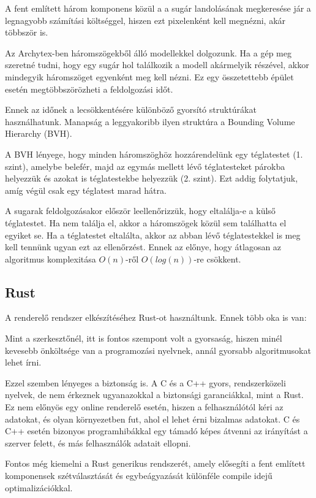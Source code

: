 A fent említett három komponens közül a a sugár landolásának megkeresése jár a legnagyobb számítási költséggel, hiszen ezt pixelenként kell megnézni, akár többször is.

Az Archytex-ben háromszögekből álló modellekkel dolgozunk. Ha a gép meg szeretné tudni, hogy egy sugár hol találkozik a modell akármelyik részével, akkor mindegyik háromszöget egyenként meg kell nézni. Ez egy összetettebb épület esetén megtöbbszörözheti a feldolgozási időt.

Ennek az időnek a lecsökkentésére különböző gyorsító struktúrákat használhatunk. Manapság a leggyakoribb ilyen struktúra a Bounding Volume Hierarchy (BVH).

A BVH lényege, hogy minden háromszöghöz hozzárendelünk egy téglatestet (1. szint), amelybe belefér, majd az egymás mellett lévő téglatesteket párokba helyezzük és azokat is téglatestekbe helyezzük (2. szint). Ezt addig folytatjuk, amíg végül csak egy téglatest marad hátra.

A sugarak feldolgozásakor először leellenőrizzük, hogy eltalálja-e a külső téglatestet. Ha nem találja el, akkor a háromszögek közül sem találhatta el egyiket se. Ha a téglatestet eltalálta, akkor az abban lévő téglatestekkel is meg kell tennünk ugyan ezt az ellenőrzést. Ennek az előnye, hogy átlagosan az algoritmus komplexitása $O(n)$-ről $O(log(n))$-re csökkent.

\subsection{Rust}
A renderelő rendszer elkészítéséhez Rust-ot használtunk. Ennek több oka is van:

Mint a szerkesztőnél, itt is fontos szempont volt a gyorsaság, hiszen minél kevesebb önköltsége van a programozási nyelvnek, annál gyorsabb algoritmusokat lehet írni.

Ezzel szemben lényeges a biztonság is. A C és a C++ gyors, rendszerközeli nyelvek, de nem érkeznek ugyanazokkal a biztonsági garanciákkal, mint a Rust. Ez nem előnyös egy online renderelő esetén, hiszen a felhasználótól kéri az adatokat, és olyan környezetben fut, ahol el lehet érni bizalmas adatokat. C és C++ esetén bizonyos programhibákkal egy támadó képes átvenni az irányítást a szerver felett, és más felhasználók adatait ellopni.

Fontos még kiemelni a Rust generikus rendszerét, amely elősegíti a fent említett komponensek szétválasztását és egybeágyazását különféle compile idejű optimalizációkkal.

